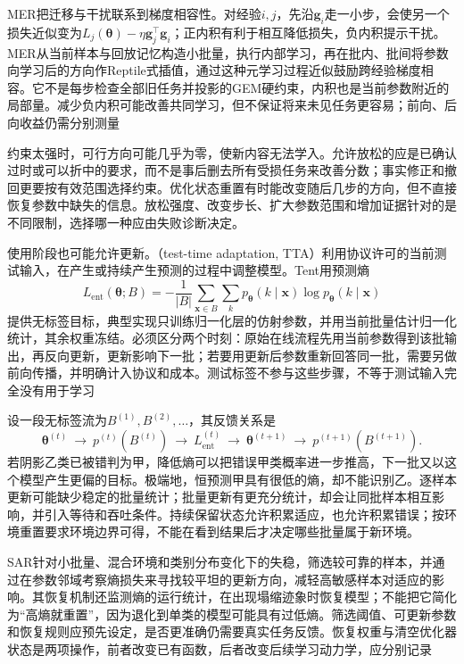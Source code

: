 MER把迁移与干扰联系到梯度相容性。对经验$i,j$，先沿$\bm g_i$走一小步，会使另一个损失近似变为$L_j(\bm\theta)-\eta\bm g_j^\top\bm g_i$；正内积有利于相互降低损失，负内积提示干扰。MER从当前样本与回放记忆构造小批量，执行内部学习，再在批内、批间将参数向学习后的方向作Reptile式插值，通过这种元学习过程近似鼓励跨经验梯度相容。它不是每步检查全部旧任务并投影的GEM硬约束，内积也是当前参数附近的局部量。减少负内积可能改善共同学习，但不保证将来未见任务更容易；前向、后向收益仍需分别测量

约束太强时，可行方向可能几乎为零，使新内容无法学入。允许放松的应是已确认过时或可以折中的要求，而不是事后删去所有受损任务来改善分数；事实修正和撤回更要按有效范围选择约束。优化状态重置有时能改变随后几步的方向，但不直接恢复参数中缺失的信息。放松强度、改变步长、扩大参数范围和增加证据针对的是不同限制，选择哪一种应由失败诊断决定。

使用阶段也可能允许更新。（test-time adaptation, TTA）利用协议许可的当前测试输入，在产生或持续产生预测的过程中调整模型。Tent用预测熵
\[
L_{\mathrm{ent}}(\bm\theta;B)
=-\frac1{|B|}\sum_{\bm x\in B}\sum_k
p_{\bm\theta}(k\mid\bm x)\log p_{\bm\theta}(k\mid\bm x)
\]
提供无标签目标，典型实现只训练归一化层的仿射参数，并用当前批量估计归一化统计，其余权重冻结。必须区分两个时刻：原始在线流程先用当前参数得到该批输出，再反向更新，更新影响下一批；若要用更新后参数重新回答同一批，需要另做前向传播，并明确计入协议和成本。测试标签不参与这些步骤，不等于测试输入完全没有用于学习

设一段无标签流为$B^{(1)},B^{(2)},\ldots$，其反馈关系是
\[
\bm\theta^{(t)}
\ \longrightarrow\ p^{(t)}(B^{(t)})
\ \longrightarrow\ L_{\mathrm{ent}}^{(t)}
\ \longrightarrow\ \bm\theta^{(t+1)}
\ \longrightarrow\ p^{(t+1)}(B^{(t+1)}).
\]
若阴影乙类已被错判为甲，降低熵可以把错误甲类概率进一步推高，下一批又以这个模型产生更偏的目标。极端地，恒预测甲具有很低的熵，却不能识别乙。逐样本更新可能缺少稳定的批量统计；批量更新有更充分统计，却会让同批样本相互影响，并引入等待和吞吐条件。持续保留状态允许积累适应，也允许积累错误；按环境重置要求环境边界可得，不能在看到结果后才决定哪些批量属于新环境。

SAR针对小批量、混合环境和类别分布变化下的失稳，筛选较可靠的样本，并通过在参数邻域考察熵损失来寻找较平坦的更新方向，减轻高敏感样本对适应的影响。其恢复机制还监测熵的运行统计，在出现塌缩迹象时恢复模型；不能把它简化为“高熵就重置”，因为退化到单类的模型可能具有过低熵。筛选阈值、可更新参数和恢复规则应预先设定，是否更准确仍需要真实任务反馈。恢复权重与清空优化器状态是两项操作，前者改变已有函数，后者改变后续学习动力学，应分别记录

